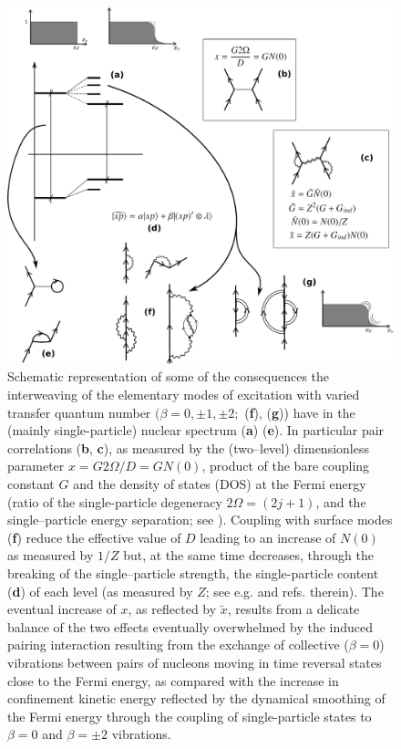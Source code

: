 \begin{figure}[h!]
\centerline {
\includegraphics*[width=13cm]{introduccion/figs/figintro6}
}
\caption{ Schematic representation of some of the consequences the interweaving of the elementary modes of excitation with varied transfer quantum number $(\beta=0,\pm1,\pm2;$  (\textbf{f}), (\textbf{g})) have in the (mainly single-particle) nuclear spectrum (\textbf{a}) (\textbf{e}). In particular pair correlations (\textbf{b}, \textbf{c}), as measured by the (two--level) dimensionless parameter $x=G2\Omega/D=GN(0)$, product of the bare coupling constant $G$ and the density of states (DOS) at the Fermi energy (ratio of the single-particle degeneracy $2\Omega=(2j+1)$, and the single--particle energy separation; see \cite{Hogassen:61,Broglia:68}). Coupling with surface modes (\textbf{f}) reduce the effective value of $D$ leading to an increase of $N(0)$ as measured by $1/Z$ but, at the same time decreases, through the breaking of the single--particle strength, the single-particle content (\textbf{d}) of each level (as measured by $Z$; see e.g. \cite{Barranco:05} and refs. therein). The eventual increase of $x$, as reflected by $\tilde x$, results from a delicate balance of the two effects eventually overwhelmed by the induced pairing interaction resulting from the exchange of collective ($\beta=0$) vibrations between pairs of nucleons moving in time reversal states close to the Fermi energy, as compared with the increase in confinement kinetic energy reflected  by the dynamical smoothing of the Fermi energy through the coupling of single-particle states to $\beta=0$ and $\beta=\pm2$ vibrations.}
\label{figintro6}
\end{figure}
